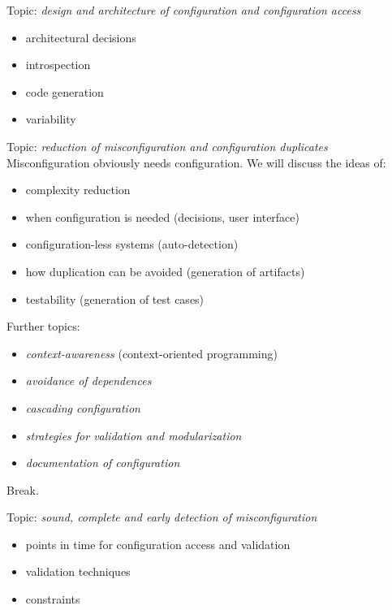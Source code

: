 \begin{frame}
	Topic: \textit{design and architecture of configuration and configuration access}
	\begin{itemize}
		\item architectural decisions
		\item introspection
		\item code generation
		\item variability
	\end{itemize}
\end{frame}

\begin{frame}
	Topic: \textit{reduction of misconfiguration and configuration duplicates} \\
	Misconfiguration obviously needs configuration.
	We will discuss the ideas of:
	\begin{itemize}
		\item complexity reduction
		\item when configuration is needed (decisions, user interface)
		\item configuration-less systems (auto-detection)
		\item how duplication can be avoided (generation of artifacts)
		\item testability (generation of test cases)
	\end{itemize}
\end{frame}

\begin{frame}
	Further topics:
	\begin{itemize}
		\item \textit{context-awareness} (context-oriented programming)
		\item \textit{avoidance of dependences}
		\item \textit{cascading configuration}
		\item \textit{strategies for validation and modularization}
		\item \textit{documentation of configuration}
	\end{itemize}
\end{frame}

\begin{assignment}
	\begin{task}
	Break.
	\end{task}
\end{assignment}

\begin{frame}
	Topic: \textit{sound, complete and early detection of misconfiguration}
	\begin{itemize}
		\item points in time for configuration access and validation
		\item validation techniques
		\item constraints
	\end{itemize}
\end{frame}

